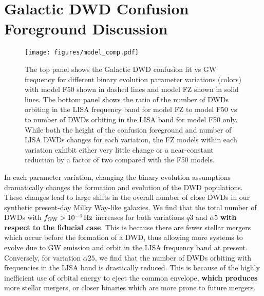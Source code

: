 \documentclass[twocolumn, linenumbers]{aastex631}
\begin{document}
\section{Galactic DWD Confusion Foreground Discussion}
\label{sec:model_compare}


\begin{figure}
	\texttt{[image: figures/model\_comp.pdf]}
    \caption{The top panel shows the Galactic DWD confusion fit vs GW frequency for different binary evolution parameter variations (colors) with model F50 shown in dashed lines and model FZ shown in solid lines. The bottom panel shows the ratio of the number of DWDs orbiting in the LISA frequency band for model FZ to model F50 vs to number of DWDs orbiting in the LISA band for model F50 only. While both the height of the confusion foreground and number of LISA DWDs changes for each variation, the FZ models within each variation exhibit either very little change or a  near-constant reduction by a factor of two compared with the F50 models.}
    \label{fig:model_comp}
\end{figure}

In each parameter variation, changing the binary evolution assumptions dramatically changes the formation and evolution of the DWD populations. These changes lead to large shifts in the overall number of close DWDs in our synthetic present-day Milky Way-like galaxies. We find that the total number of DWDs with $f_{\rm{GW}}>10^{-4}\,\rm{Hz}$ increases for both variations $q3$ and $\alpha5$ \textbf{with respect to the fiducial case}. This is because there are fewer stellar mergers which occur before the formation of a DWD, thus allowing more systems to evolve due to GW emission and orbit in the LISA frequency band at present. Conversely, for variation $\alpha25$, we find that the number of DWDs orbiting with frequencies in the LISA band is drastically reduced. This is because of the highly inefficient use of orbital energy to eject the common envelope, \textbf{which produces} more stellar mergers, or closer binaries which are more prone to future mergers.
\end{document}
